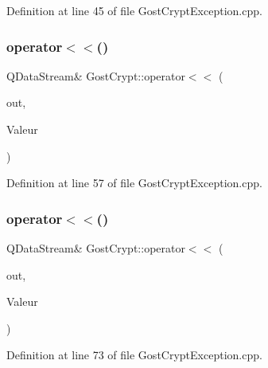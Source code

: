 Definition at line 45 of file Gost\+Crypt\+Exception.\+cpp.

\mbox{\label{namespace_gost_crypt_a7f9cbebff0031b2118e621e71c775a2b}} 
\subsubsection{\texorpdfstring{operator$<$$<$()}{operator<<()}\hspace{0.1cm}{\footnotesize\ttfamily [3/13]}}
{\footnotesize\ttfamily Q\+Data\+Stream\& Gost\+Crypt\+::operator$<$$<$ (\begin{DoxyParamCaption}\item[{Q\+Data\+Stream \&}]{out,  }\item[{const \hyperlink{class_gost_crypt_1_1_failed_open_file}{Gost\+Crypt\+::\+Failed\+Open\+File} \&}]{Valeur }\end{DoxyParamCaption})}



Definition at line 57 of file Gost\+Crypt\+Exception.\+cpp.

\mbox{\label{namespace_gost_crypt_a8961bd330175b243df8f40b99a6b0964}} 
\subsubsection{\texorpdfstring{operator$<$$<$()}{operator<<()}\hspace{0.1cm}{\footnotesize\ttfamily [4/13]}}
{\footnotesize\ttfamily Q\+Data\+Stream\& Gost\+Crypt\+::operator$<$$<$ (\begin{DoxyParamCaption}\item[{Q\+Data\+Stream \&}]{out,  }\item[{const \hyperlink{class_gost_crypt_1_1_failed_write_file}{Gost\+Crypt\+::\+Failed\+Write\+File} \&}]{Valeur }\end{DoxyParamCaption})}



Definition at line 73 of file Gost\+Crypt\+Exception.\+cpp.

\mbox{\label{namespace_gost_crypt_a7fe325fa6a2d8024c438723c68f28250}} 
